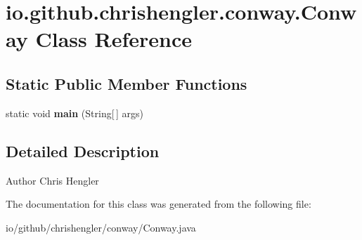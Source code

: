 \hypertarget{classio_1_1github_1_1chrishengler_1_1conway_1_1_conway}{}\section{io.\+github.\+chrishengler.\+conway.\+Conway Class Reference}
\label{classio_1_1github_1_1chrishengler_1_1conway_1_1_conway}
\subsection*{Static Public Member Functions}
\begin{DoxyCompactItemize}
\item 
static void {\bfseries main} (String\mbox{[}$\,$\mbox{]} args)\hypertarget{classio_1_1github_1_1chrishengler_1_1conway_1_1_conway_a4f37ce546965471d21075e3858881bbb}{}\label{classio_1_1github_1_1chrishengler_1_1conway_1_1_conway_a4f37ce546965471d21075e3858881bbb}

\end{DoxyCompactItemize}


\subsection{Detailed Description}
\begin{DoxyAuthor}{Author}
Chris Hengler 
\end{DoxyAuthor}


The documentation for this class was generated from the following file\+:\begin{DoxyCompactItemize}
\item 
io/github/chrishengler/conway/Conway.\+java\end{DoxyCompactItemize}
